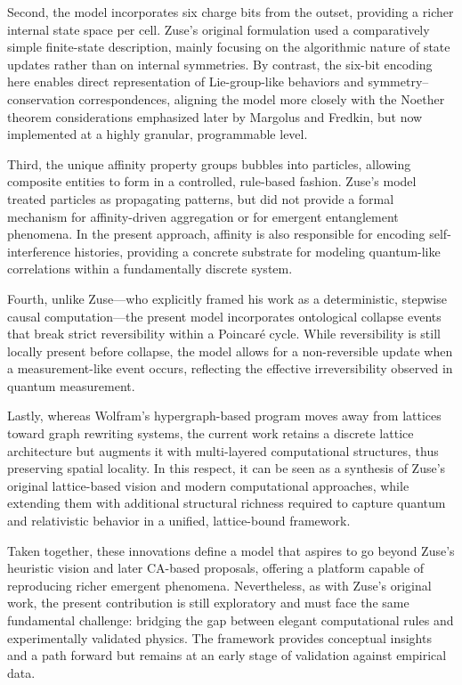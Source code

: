 \documentclass[12pt,english]{article}
\begin{document}
Second, the model incorporates six charge bits from the outset, providing a richer internal state space per cell. Zuse’s original formulation used a comparatively simple finite-state description, mainly focusing on the algorithmic nature of state updates rather than on internal symmetries. By contrast, the six-bit encoding here enables direct representation of Lie-group-like behaviors and symmetry–conservation correspondences, aligning the model more closely with the Noether theorem considerations emphasized later by Margolus and Fredkin, but now implemented at a highly granular, programmable level.

Third, the unique affinity property groups bubbles into particles, allowing composite entities to form in a controlled, rule-based fashion. Zuse’s model treated particles as propagating patterns, but did not provide a formal mechanism for affinity-driven aggregation or for emergent entanglement phenomena. In the present approach, affinity is also responsible for encoding self-interference histories, providing a concrete substrate for modeling quantum-like correlations within a fundamentally discrete system.

Fourth, unlike Zuse—who explicitly framed his work as a deterministic, stepwise causal computation—the present model incorporates ontological collapse events that break strict reversibility within a Poincaré cycle. While reversibility is still locally present before collapse, the model allows for a non-reversible update when a measurement-like event occurs, reflecting the effective irreversibility observed in quantum measurement.

Lastly, whereas Wolfram’s hypergraph-based program moves away from lattices toward graph rewriting systems, the current work retains a discrete lattice architecture but augments it with multi-layered computational structures, thus preserving spatial locality. In this respect, it can be seen as a synthesis of Zuse’s original lattice-based vision and modern computational approaches, while extending them with additional structural richness required to capture quantum and relativistic behavior in a unified, lattice-bound framework.

Taken together, these innovations define a model that aspires to go beyond Zuse’s heuristic vision and later CA-based proposals, offering a platform capable of reproducing richer emergent phenomena. Nevertheless, as with Zuse’s original work, the present contribution is still exploratory and must face the same fundamental challenge: bridging the gap between elegant computational rules and experimentally validated physics. The framework provides conceptual insights and a path forward but remains at an early stage of validation against empirical data.
\end{document}
